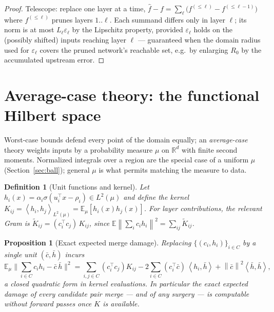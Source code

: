 \documentclass[11pt]{article}
\newtheorem{proposition}[theorem]{Proposition}
\newtheorem{definition}[theorem]{Definition}
\theoremstyle{remark}
\newcommand{\R}{\mathbb{R}}
\newcommand{\E}{\mathbb{E}}
\newcommand{\relu}{\sigma}
\newcommand{\norm}[1]{\left\lVert #1 \right\rVert}
\newcommand{\ip}[2]{\left\langle #1, #2 \right\rangle}
\begin{document}
\begin{proof}
Telescope: replace one layer at a time,
$\hat f - f = \sum_\ell \big(f^{(\le \ell)} - f^{(\le \ell-1)}\big)$ where
$f^{(\le \ell)}$ prunes layers $1..\ell$. Each summand differs only in layer
$\ell$; its norm is at most $L_\ell \varepsilon_\ell$ by the Lipschitz
property, provided $\varepsilon_\ell$ holds on the (possibly shifted) inputs
reaching layer $\ell$ --- guaranteed when the domain radius used for
$\varepsilon_\ell$ covers the pruned network's reachable set, e.g.\ by
enlarging $R_0$ by the accumulated upstream error.
\end{proof}

\section{Average-case theory: the functional Hilbert space}
\label{sec:functional}

Worst-case bounds defend every point of the domain equally; an
\emph{average-case} theory weights inputs by a probability measure $\mu$ on
$\R^d$ with finite second moments. Normalized integrals over a region are
the special case of a uniform $\mu$ (Section~\ref{sec:ball}); general
$\mu$ is what permits matching the measure to data.

\begin{definition}[Unit functions and kernel]\label{def:kernel}
Let $h_i(x) = \alpha_i \relu(u_i^\top x - \rho_i) \in L^2(\mu)$ and define
the kernel
$K_{ij} = \ip{h_i}{h_j}_{L^2(\mu)} = \E_\mu[h_i(x) h_j(x)]$.
For layer contributions, the relevant Gram is
$\widetilde K_{ij} = (c_i^\top c_j)\,K_{ij}$, since
$\E\norm{\sum_i c_i h_i}^2 = \sum_{ij} \widetilde K_{ij}$.
\end{definition}

\begin{proposition}[Exact expected merge damage]\label{prop:damage}
Replacing $\{(c_i,h_i)\}_{i\in C}$ by a single unit $(\bar c, \bar h)$ incurs
\[
  \E_\mu\Big\lVert \sum_{i\in C} c_i h_i - \bar c\, \bar h \Big\rVert^2
  = \sum_{i,j\in C} (c_i^\top c_j) K_{ij}
  - 2\sum_{i\in C} (c_i^\top \bar c)\, \ip{h_i}{\bar h}
  + \norm{\bar c}^2 \ip{\bar h}{\bar h},
\]
a closed quadratic form in kernel evaluations. In particular the exact
expected damage of every candidate pair merge --- and of any surgery ---
is computable without forward passes once $K$ is available.
\end{proposition}
\end{document}
